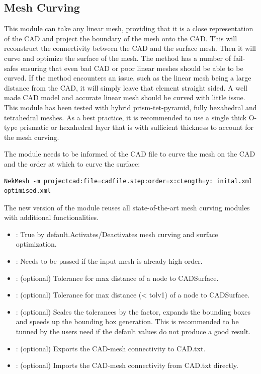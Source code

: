  

\subsection{Mesh Curving}
This module can take any linear mesh, providing that it is a close
representation of the CAD and project the boundary of the mesh onto the CAD.
This will reconstruct the connectivity between the CAD and the surface mesh.
Then it will curve and optimize the surface of the mesh. The method has a number
of fail-safes ensuring that even bad CAD or poor linear meshes should be able 
to be curved. If the method encounters an issue, such as the linear mesh being a
large distance from the CAD, it will simply leave that element straight sided. A
well made CAD model and accurate linear mesh should be curved with little issue.
This module has been tested with hybrid prism-tet-pyramid, fully hexahedral and
tetrahedral meshes. As a best practice, it is recommended to use a single thick
O-type prismatic or hexahedral layer that is with sufficient thickness to account
for the mesh curving. 

The module needs to be informed of the CAD file to curve the mesh on the CAD and the
order at which to curve the surface:
\begin{lstlisting}[style=BashInputStyle]
  NekMesh -m projectcad:file=cadfile.step:order=x:cLength=y: inital.xml optimised.xml
\end{lstlisting}

The new version of the module reuses all state-of-the-art mesh curving modules with additional functionalities. 

\begin{itemize}
  \item {}: True by default.Activates/Deactivates mesh curving and surface optimization. 
  \item {}: Needs to be passed if the input mesh is already high-order.
  \item {}: (optional) Tolerance for max distance of a node to CADSurface.
  \item {}: (optional) Tolerance for max distance  (< tolv1) of a node to CADSurface.
  \item {}: (optional) Scales the tolerances by the factor, expands the
  bounding boxes and speeds up the bounding box generation. This is recommended
  to be tunned by the users need if the default values do not produce a good result.
  \item {}: (optional) Exports the CAD-mesh connectivity to CAD.txt.
  \item {}:  (optional) Imports the CAD-mesh connectivity from CAD.txt directly.
\end{itemize}

